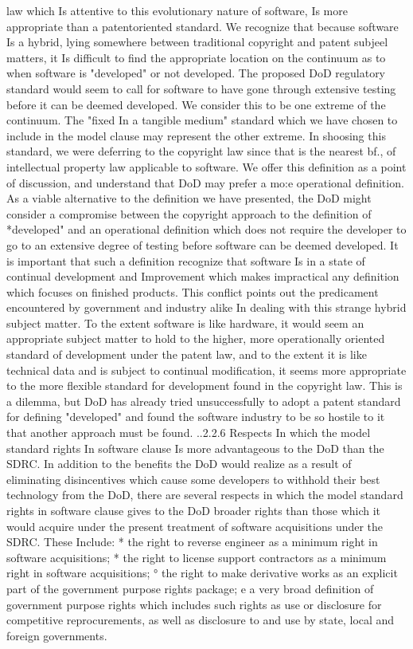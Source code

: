 \documentclass[12pt]{article}
\begin{document}
law which Is attentive to this evolutionary nature of software, Is more appropriate than a patentoriented standard.
We recognize that because software Is a hybrid, lying somewhere between traditional copyright and
patent subjeel matters, it Is difficult to find the appropriate location on the continuum as to when
software is "developed" or not developed. The proposed DoD regulatory standard would seem to call
for software to have gone through extensive testing before it can be deemed developed. We consider this to be one extreme of the continuum. The "fixed In a tangible medium" standard which we
have chosen to include in the model clause may represent the other extreme.
In shoosing this standard, we were deferring to the copyright law since that is the nearest bf., of
intellectual property law applicable to software. We offer this definition as a point of discussion, and
understand that DoD may prefer a mo:e operational definition. As a viable alternative to the definition
we have presented, the DoD might consider a compromise between the copyright approach to the
definition of *developed" and an operational definition which does not require the developer to go to
an extensive degree of testing before software can be deemed developed. It is important that such a
definition recognize that software Is in a state of continual development and Improvement which
makes impractical any definition which focuses on finished products. This conflict points out the
predicament encountered by government and industry alike In dealing with this strange hybrid subject
matter. To the extent software is like hardware, it would seem an appropriate subject matter to hold
to the higher, more operationally oriented standard of development under the patent law, and to the
extent it is like technical data and is subject to continual modification, it seems more appropriate to
the more flexible standard for development found in the copyright law. This is a dilemma, but DoD
has already tried unsuccessfully to adopt a patent standard for defining "developed" and found the
software industry to be so hostile to it that another approach must be found.
..2.2.6 Respects In which the model standard rights In software clause Is more advantageous
to the DoD than the SDRC.
In addition to the benefits the DoD would realize as a result of eliminating disincentives which cause
some developers to withhold their best technology from the DoD, there are several respects in which
the model standard rights in software clause gives to the DoD broader rights than those which it
would acquire under the present treatment of software acquisitions under the SDRC. These Include:
* the right to reverse engineer as a minimum right in software acquisitions;
* the right to license support contractors as a minimum right in software acquisitions;
° the right to make derivative works as an explicit part of the government purpose rights
package;
e a very broad definition of government purpose rights which includes such rights as use or
disclosure for competitive reprocurements, as well as disclosure to and use by state,
local and foreign governments.
\end{document}
